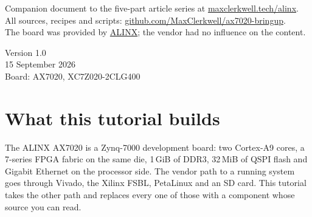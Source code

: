 \documentclass[11pt,a4paper,oneside]{article}
\newcommand{\repo}{https://github.com/MaxClerkwell/ax7020-bringup}
\newcommand{\series}{\href{https://maxclerkwell.tech/alinx/}{maxclerkwell.tech/alinx}}
\begin{document}
\begin{titlepage}
\vfill
\begin{minipage}{0.56\textwidth}
\small\color{muted}
Companion document to the five-part article series at \series.
All sources, recipes and scripts: \href{\repo}{github.com/MaxClerkwell/ax7020-bringup}.\\
The board was provided by \href{https://www.alinx.com/}{ALINX}; the vendor had no
influence on the content.
\end{minipage}
\hfill
\begin{minipage}{0.38\textwidth}
\raggedleft\small\color{muted}
Version 1.0\\
15 September 2026\\
Board: AX7020, XC7Z020-2CLG400
\end{minipage}
\end{titlepage}

\tableofcontents
\clearpage

\section{What this tutorial builds}

The ALINX AX7020 is a Zynq-7000 development board: two Cortex-A9 cores, a
7-series FPGA fabric on the same die, 1\,GiB of DDR3, 32\,MiB of QSPI flash and
Gigabit Ethernet on the processor side. The vendor path to a running system
goes through Vivado, the Xilinx FSBL, PetaLinux and an SD card. This tutorial
takes the other path and replaces every one of those with a component whose
source you can read.
\end{document}

